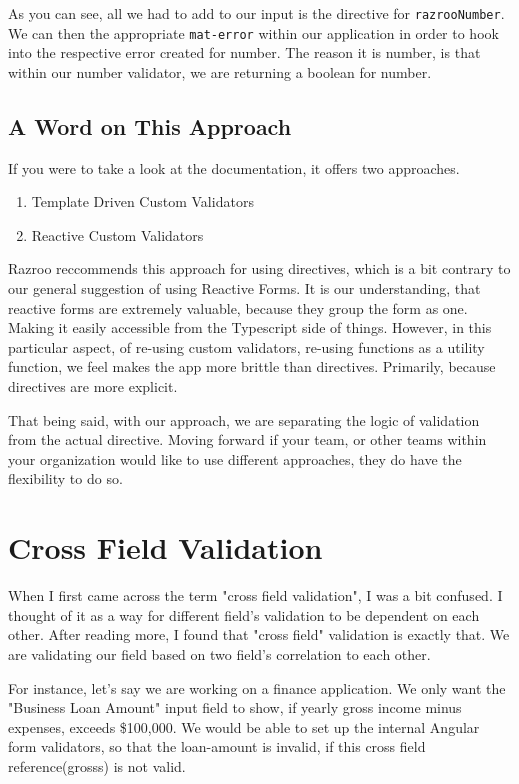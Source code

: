 As you can see, all we had to add to our input is the directive for 
\lstinline{razrooNumber}. We can then the appropriate \lstinline{mat-error}
within our application in order to hook into the respective error created for number.
The reason it is number, is that within our number validator, we are returning a 
boolean for number. 

\subsection{A Word on This Approach}
If you were to take a look at the documentation, it offers two approaches.
\begin{enumerate}
  \item Template Driven Custom Validators 
  \item Reactive Custom Validators 
\end{enumerate}

Razroo reccommends this approach for using directives, which is a bit contrary to our 
general suggestion of using Reactive Forms. It is our understanding, that reactive 
forms are extremely valuable, because they group the form as one. Making it 
easily accessible from the Typescript side of things. However, in this
particular aspect, of re-using custom validators, re-using functions as a utility 
function, we feel makes the app more brittle than directives. Primarily, because 
directives are more explicit. 

That being said, with our approach, we are separating the logic of validation from 
the actual directive. Moving forward if your team, or other teams within your 
organization would like to use different approaches, they do have the 
flexibility to do so. 

\section{Cross Field Validation}
When I first came across the term "cross field validation", I was a bit 
confused. I thought of it as a way for different field's validation to 
be dependent on each other. After reading more, I found that "cross 
field" validation is exactly that. We are validating our field based on 
two field's correlation to each other. 

For instance, let's say we are working on a finance application. We only want
the "Business Loan Amount" input field to show, if yearly gross income minus expenses, 
exceeds \$100,000. We would be able to set up the internal Angular form validators,
so that the loan-amount is invalid, if this cross field reference(grosss) is not valid. 

